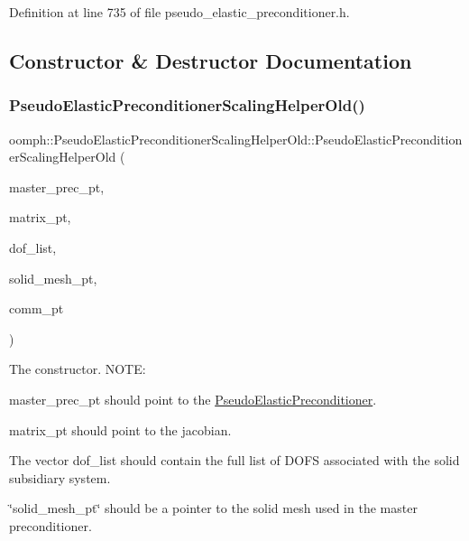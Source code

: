 Definition at line 735 of file pseudo\+\_\+elastic\+\_\+preconditioner.\+h.



\subsection{Constructor \& Destructor Documentation}
\mbox{\label{classoomph_1_1PseudoElasticPreconditionerScalingHelperOld_a90a89541c9067f06446c2a0e9e3c5398}} 
\subsubsection{\texorpdfstring{Pseudo\+Elastic\+Preconditioner\+Scaling\+Helper\+Old()}{PseudoElasticPreconditionerScalingHelperOld()}\hspace{0.1cm}{\footnotesize\ttfamily [1/2]}}
{\footnotesize\ttfamily oomph\+::\+Pseudo\+Elastic\+Preconditioner\+Scaling\+Helper\+Old\+::\+Pseudo\+Elastic\+Preconditioner\+Scaling\+Helper\+Old (\begin{DoxyParamCaption}\item[{Block\+Preconditioner$<$ C\+R\+Double\+Matrix $>$ $\ast$}]{master\+\_\+prec\+\_\+pt,  }\item[{C\+R\+Double\+Matrix $\ast$}]{matrix\+\_\+pt,  }\item[{Vector$<$ unsigned $>$ \&}]{dof\+\_\+list,  }\item[{const Mesh $\ast$const}]{solid\+\_\+mesh\+\_\+pt,  }\item[{const Oomph\+Communicator $\ast$}]{comm\+\_\+pt }\end{DoxyParamCaption})\hspace{0.3cm}{\ttfamily [inline]}}

The constructor. N\+O\+TE\+:
\begin{DoxyEnumerate}
\item master\+\_\+prec\+\_\+pt should point to the \hyperlink{classoomph_1_1PseudoElasticPreconditioner}{Pseudo\+Elastic\+Preconditioner}.
\item matrix\+\_\+pt should point to the jacobian.
\item The vector dof\+\_\+list should contain the full list of D\+O\+FS associated with the solid subsidiary system.
\item \char`\"{}solid\+\_\+mesh\+\_\+pt\char`\"{} should be a pointer to the solid mesh used in the master preconditioner. 
\end{DoxyEnumerate}


